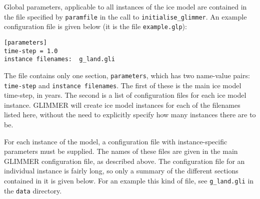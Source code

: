 Global parameters, applicable to all instances of the ice model are contained
in the file specified by \texttt{paramfile} in the call to
\texttt{initialise\_glimmer}. An example configuration file is given below (it is
the file \texttt{example.glp}):
%
\begin{verbatim}
[parameters]
time-step = 1.0
instance filenames:  g_land.gli
\end{verbatim}
%
The file contains only one section, \texttt{parameters}, which has two
name-value pairs: \texttt{time-step} and \texttt{instance filenames}. The
first of these is the main ice model time-step, in years. The second is a list
of configuration files for each ice model instance. GLIMMER will 
create ice model instances for each of the filenames listed here, without the
need to explicitly specify how many instances there are to be.

For each instance of the model, a configuration file with instance-specific
parameters must be supplied. The names of these files are given in the main
GLIMMER configuration file, as described above. The configuration file for an individual
instance is fairly long, so only a summary of the different sections
contained in it is given below. For an example this kind of file, see
\texttt{g\_land.gli} in the \texttt{data} directory.

